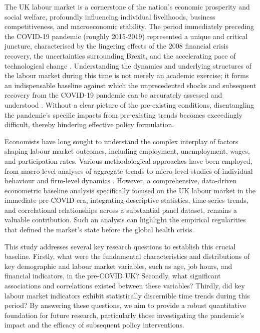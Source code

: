 \documentclass[11pt,a4paper]{article}
\begin{document}
The UK labour market is a cornerstone of the nation's economic prosperity and social welfare, profoundly influencing individual livelihoods, business competitiveness, and macroeconomic stability. The period immediately preceding the COVID-19 pandemic (roughly 2015-2019) represented a unique and critical juncture, characterised by the lingering effects of the 2008 financial crisis recovery, the uncertainties surrounding Brexit, and the accelerating pace of technological change \cite{ref1}. Understanding the dynamics and underlying structures of the labour market during this time is not merely an academic exercise; it forms an indispensable baseline against which the unprecedented shocks and subsequent recovery from the COVID-19 pandemic can be accurately assessed and understood \cite{ref7}. Without a clear picture of the pre-existing conditions, disentangling the pandemic's specific impacts from pre-existing trends becomes exceedingly difficult, thereby hindering effective policy formulation.

Economists have long sought to understand the complex interplay of factors shaping labour market outcomes, including employment, unemployment, wages, and participation rates. Various methodological approaches have been employed, from macro-level analyses of aggregate trends to micro-level studies of individual behaviour and firm-level dynamics \cite{ref4}. However, a comprehensive, data-driven econometric baseline analysis specifically focused on the UK labour market in the immediate pre-COVID era, integrating descriptive statistics, time-series trends, and correlational relationships across a substantial panel dataset, remains a valuable contribution. Such an analysis can highlight the empirical regularities that defined the market's state before the global health crisis.

This study addresses several key research questions to establish this crucial baseline. Firstly, what were the fundamental characteristics and distributions of key demographic and labour market variables, such as age, job hours, and financial indicators, in the pre-COVID UK? Secondly, what significant associations and correlations existed between these variables? Thirdly, did key labour market indicators exhibit statistically discernible time trends during this period? By answering these questions, we aim to provide a robust quantitative foundation for future research, particularly those investigating the pandemic's impact and the efficacy of subsequent policy interventions.
\end{document}
